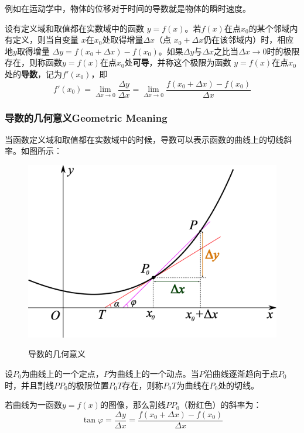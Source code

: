 \documentclass[UTF8]{ctexart}
\begin{document}
{	例如在运动学中，物体的位移对于时间的导数就是物体的瞬时速度。
\begin{question}
	设有定义域和取值都在实数域中的函数 $y=f(x)$。若$f(x)$在点$x_0$的某个邻域内有定义，则当自变量 $x$在$x_0$处取得增量$\Delta x$（点 $x_{0}+\Delta x$仍在该邻域内）时，相应地$y$取得增量 $\Delta y=f(x_0+\Delta x)-f(x_0)$。如果$\Delta y$与$\Delta x$之比当$\Delta x\to 0 $时的极限存在，则称函数$y=f(x)$在点$x_0$处\textbf{可导}，并称这个极限为函数 $y=f(x)$在点$x_0$处的\textbf{导数}，记为$f'(x_0)$，即
\begin{equation}
  f'(x_0)=\lim_{\Delta x \to 0} \frac{\Delta y}{\Delta x}=\lim_{\Delta x \to 0} \frac{f(x_0+\Delta x)-f(x_0)}{\Delta x}
\end{equation}
\end{question}

\subsubsection{导数的几何意义Geometric Meaning}
当函数定义域和取值都在实数域中的时候，导数可以表示函数的曲线上的切线斜率。如图所示：
\begin{figure}[H]
  \centering
  \includegraphics[scale=0.4]{Derivative.png}\\
  \caption{导数的几何意义}
\end{figure}

设$P_0$为曲线上的一个定点，$P$为曲线上的一个动点。当$P$沿曲线逐渐趋向于点$P_0$时，并且割线$PP_0$的极限位置$P_0T$存在，则称$P_0T$为曲线在$P_0$处的切线。

若曲线为一函数$y=f(x)$的图像，那么割线$PP_0$（粉红色）的斜率为：
\begin{equation}
  \tan \varphi = \frac{\Delta y}{\Delta x}=\frac{f(x_0+\Delta x)-f(x_0)}{\Delta x}
\end{equation}

}
\end{document}

